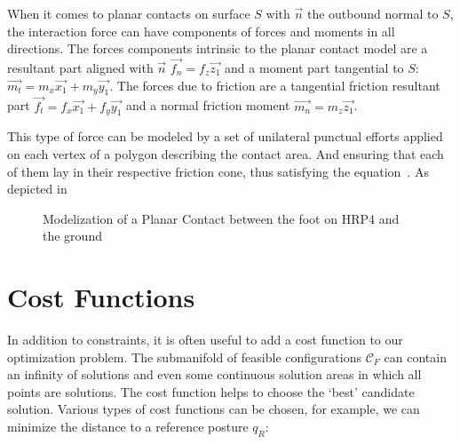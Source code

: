 When it comes to planar contacts on surface $S$ with $\vec{n}$ the outbound normal to $S$, the interaction force can have components of forces and moments in all directions.
The forces components intrinsic to the planar contact model are a resultant part aligned with $\vec{n}$ $\vec{f_n} = f_z \vec{z_1}$ and a moment part tangential to $S$: $\vec{m_t} = m_x \vec{x_1} + m_y \vec{y_1}$.
The forces due to friction are a tangential friction resultant part $\vec{f_t} = f_x \vec{x_1} + f_y \vec{y_1}$ and a normal friction moment $\vec{m_n} = m_z \vec{z_1}$.

This type of force can be modeled by a set of unilateral punctual efforts applied on each vertex of a polygon describing the contact area.
And ensuring that each of them lay in their respective friction cone, thus satisfying the equation~.
As depicted in~

\begin{figure}[htpb]
  \centering
  \setlength{\fboxsep}{0pt}%
  \setlength{\fboxrule}{1pt}%
  \caption{Modelization of a Planar Contact between the foot on HRP4 and the ground}
\label{fig:planarContact}
\end{figure}



\section{Cost Functions}
\label{sec:cost_functions}


In addition to constraints, it is often useful to add a cost function to our optimization problem.
The submanifold of feasible configurations $\mathcal{C}_F$ can contain an infinity of solutions and even some continuous solution areas in which all points are solutions.
The cost function helps to choose the `best' candidate solution.
Various types of cost functions can be chosen, for example, we can minimize the distance to a reference posture $q_R$:

